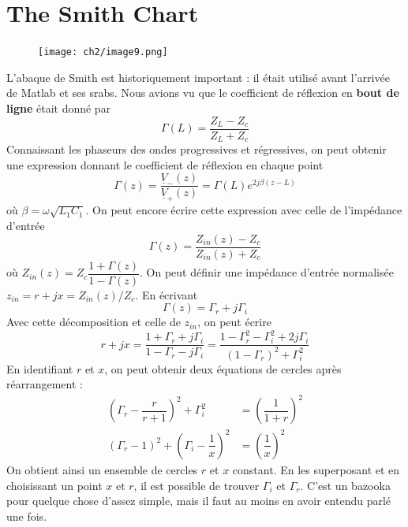 \section{The Smith Chart}
	\begin{figure}
	\vspace{-5mm}
	\texttt{[image: ch2/image9.png]}
	\end{figure}
L'abaque de Smith est historiquement important : il était utilisé avant l'arrivée de Matlab 
et ses srabs. Nous avions vu que le coefficient de réflexion en \textbf{bout de ligne} était 
donné par
\begin{equation}
\Gamma(L) = \dfrac{Z_L-Z_c}{Z_L+Z_c}
\end{equation}
Connaissant les phaseurs des ondes progressives et régressives, on peut obtenir une expression 
donnant le coefficient de réflexion en chaque point
\begin{equation}
\Gamma(z) = \dfrac{\underline{V}_-(z)}{\underline{V}_+(z)}=\Gamma(L)e^{2j\beta(z-L)} 
\end{equation}
où $\beta = \omega\sqrt{L_1C_1}$. On peut encore écrire cette expression avec celle de l'impédance 
d'entrée
\begin{equation}
\Gamma(z) = \dfrac{Z_{in}(z)-Z_c}{Z_{in}(z)+Z_c}
\end{equation}
où $Z_{in}(z) = Z_c\dfrac{1+\Gamma(z)}{1-\Gamma(z)}$. On peut définir une impédance d'entrée 
normalisée $z_{in} = r+jx = Z_{in}(z)/Z_c$. En écrivant
\begin{equation}
\Gamma(z) = \Gamma_r + j\Gamma_i
\end{equation}
Avec cette décomposition et celle de $z_{in}$, on peut écrire
\begin{equation}
r+jx = \dfrac{1+\Gamma_r+j\Gamma_i}{1-\Gamma_r-j\Gamma_i} = \dfrac{1-\Gamma_r^2-\Gamma_i^2+2j
\Gamma_i}{(1-\Gamma_r)^2+\Gamma_i^2}
\end{equation}
En identifiant $r$ et $x$, on peut obtenir deux équations de cercles après réarrangement :
\begin{equation}
\begin{split}
\left(\Gamma_r -\dfrac{r}{r+1}\right)^2 + \Gamma_i^2 &= \left(\dfrac{1}{1+r}\right)^2\\
(\Gamma_r-1)^2 +\left(\Gamma_i-\dfrac{1}{x}\right)^2 &= \left(\dfrac{1}{x}\right)^2
\end{split}
\end{equation}
On obtient ainsi un ensemble de cercles $r$ et $x$ constant. En les superposant et en 
choisissant un point $x$ et $r$, il est possible de trouver $\Gamma_i$ et $\Gamma_r$. C'est 
un bazooka pour quelque chose d'assez simple, mais il faut au moins en avoir entendu 
parlé une fois.

